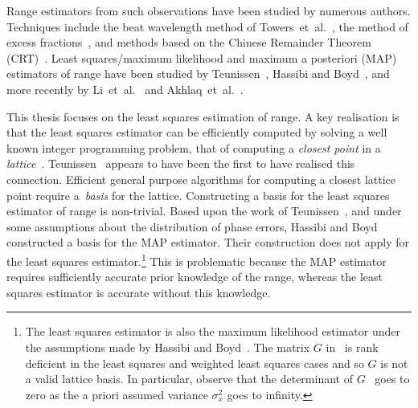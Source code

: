 Range estimators from such observations have been studied by numerous authors.  Techniques include the beat wavelength method of Towers~et~al.~\cite{Towers_frequency_selection_interferometry_2003,Towers:04_generalised_frequency_selection}, the method of excess fractions~\cite{Falaggis_excess_fractions_2011,Falaggis_excess_fractions_2012,Falaggis_excess_fractions_2013,Falaggis_algebraic_solution_2014}, and methods based on the Chinese Remainder Theorem (CRT)~\cite{Oystein_Ore_general_chinese_Remainder_1952, Oded_Chinese_remaindering_with_errors_2000, Xia_generalised_CRT_2005, Xia2007, XWLi2008, W.Wang_closed_form_crt_2010, YangBin_range_estimation_with_CRT_2014, Xiao_multistage_crt_2014}.  Least squares/maximum likelihood and maximum a posteriori (MAP) estimators of range have been studied by Teunissen~\cite{Teunissen_GPS_1995}, Hassibi and Boyd~\cite{Hassibi_GPS_1998}, and more recently by Li~et~al.~\cite{Li_distance_est_wrapped_phase} and Akhlaq~et~al.~\cite{Akhlaq_basis_construction_range_est_2015}.  

This thesis focuses on the least squares estimation of range. A key realisation is that the least squares estimator can be efficiently computed by solving a well known integer programming problem, that of computing a \emph{closest point} in a \emph{lattice}~\cite{Agrell2002}.  Teunissen~\cite{Teunissen_GPS_1995} appears to have been the first to have realised this connection. Efficient general purpose algorithms for computing a closest lattice point require a~\emph{basis} for the lattice.  Constructing a basis for the least squares estimator of range is non-trivial.  Based upon the work of Teunissen~\cite{Teunissen_GPS_1995}, and under some assumptions about the distribution of phase errors, Hassibi and Boyd~\cite{Hassibi_GPS_1998} constructed a basis for the MAP estimator.  Their construction does not apply for the least squares estimator.\footnote{The least squares estimator is also the maximum likelihood estimator under the assumptions made by Hassibi and Boyd~\cite{Hassibi_GPS_1998}.  The matrix $G$ in~\cite{Hassibi_GPS_1998} is rank deficient in the least squares and weighted least squares cases and so $G$ is not a valid lattice basis.  In particular, observe that the determinant of $G$~\cite[p.~2948]{Hassibi_GPS_1998} goes to zero as the a priori assumed variance $\sigma_x^2$ goes to infinity.}  This is problematic because the MAP estimator requires sufficiently accurate prior knowledge of the range, whereas the least squares estimator is accurate without this knowledge.  

